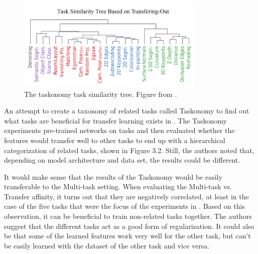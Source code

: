 \begin{figure}[h!] 
\centering 
\includegraphics[width=0.8\textwidth]{imgs/taskonomy.png}
\caption{The taskonomy task similarity tree. Figure from \citep{taskonomy}.\label{fig:params}}
\end{figure}

An attempt to create a taxonomy of related tasks called Taskonomy to find out what tasks are beneficial for transfer learning exists in \citep{taskonomy}. 
The Taskonomy experiments pre-trained networks on tasks and then evaluated whether the features would transfer well to other tasks to end up with a hierarchical categorization of related tasks, shown in Figure 3.2. 
Still, the authors noted that, depending on model architecture and data set, the results could be different.

It would make sense that the results of the Taskonomy would be easily transferable to the Multi-task setting. 
When evaluating the Multi-task vs. Transfer affinity, it turns out that they are negatively correlated, at least in the case of the five tasks that were the focus of the experiments in \citep{whichTasks}. 
Based on this observation, it can be beneficial to train non-related tasks together. 
The authors suggest that the different tasks act as a good form of regularization. 
It could also be that some of the learned features work very well for the other task, but can't be easily learned with the dataset of the other task and vice versa.